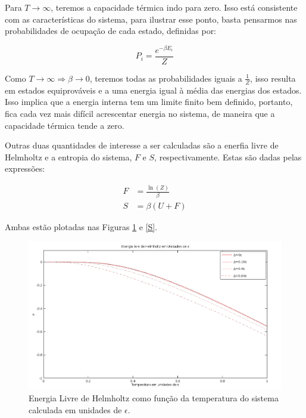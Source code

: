Para $T \rightarrow \infty$, teremos a capacidade térmica indo para zero. Isso está consistente com as características do sistema, para ilustrar esse ponto, basta pensarmos nas probabilidades de ocupação de cada estado, definidas por:

\begin{equation}
P_i=\frac{e^{-\beta E_i}}{Z}
\end{equation}

Como $T \rightarrow \infty \Rightarrow \beta \rightarrow 0$, teremos todas as probabilidades iguais a $\frac{1}{Z}$, isso resulta em estados equiprováveis e a uma energia igual à média das energias dos estados. Isso implica que a energia interna tem um limite finito bem definido, portanto, fica cada vez mais difícil acrescentar energia no sistema, de maneira que a capacidade térmica tende a zero.

\par

Outras duas quantidades de interesse a ser calculadas são a enerfia livre de Helmholtz e a entropia do sistema, $F$ e $S$, respectivamente. Estas são dadas pelas expressões:

\begin{equation}
\begin{split}
F & = \frac{\ln(Z)}{\beta} \\
S & = \beta(U + F)
\end{split}
\end{equation}

Ambas estão plotadas nas Figuras \ref{F} e \ref{S}.

\begin{figure}[!h]
\includegraphics[scale=.3]{F0a1}
\caption{Energia Livre de Helmholtz como função da temperatura do sistema calculada em unidades de $\epsilon$.}
\label{F}
\end{figure}

